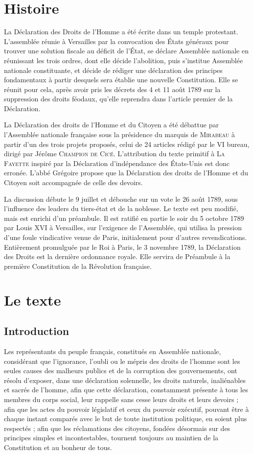\documentclass{book}
\begin{document}
\chapter{Histoire}
La Déclaration des Droits de l'Homme a été écrite dans un temple protestant. L’assemblée réunie à Versailles par la convocation des États généraux pour trouver une solution fiscale au déficit de l’État, se déclare Assemblée nationale en réunissant les trois ordres, dont elle décide l’abolition, puis s’institue Assemblée nationale constituante, et décide de rédiger une déclaration des principes fondamentaux à partir desquels sera établie une nouvelle Constitution. Elle se réunit pour cela, après avoir pris les décrets des 4 et 11 août 1789 sur la suppression des droits féodaux, qu’elle reprendra dans l’article premier de la Déclaration.

La Déclaration des droits de l’Homme et du Citoyen a été débattue par l’Assemblée nationale française sous la présidence du marquis de \textsc{Mirabeau} à partir d’un des trois projets proposés, celui de 24 articles rédigé par le VI bureau, dirigé par Jérôme \textsc{Champion de Cicé}. L’attribution du texte primitif à \textsc{La Fayette} inspiré par la Déclaration d'indépendance des États-Unis est donc erronée. L’abbé Grégoire propose que la Déclaration des droits de l’Homme et du Citoyen soit accompagnée de celle des devoirs.

La discussion débute le 9 juillet et débouche sur un vote le 26 août 1789, sous l’influence des leaders du tiers-état et de la noblesse. Le texte est peu modifié, mais est enrichi d’un préambule. Il est ratifié en partie le soir du 5 octobre 1789 par Louis XVI à Versailles, sur l’exigence de l’Assemblée, qui utilisa la pression d’une foule vindicative venue de Paris, initialement pour d’autres revendications.
Entièrement promulguée par le Roi à Paris, le 3 novembre 1789, la Déclaration des Droits est la dernière ordonnance royale. Elle servira de Préambule à la première Constitution de la Révolution française.

\chapter{Le texte}
\section{Introduction}

Les représentants du peuple français, constitués en Assemblée nationale, considérant que l’ignorance, l’oubli ou le mépris des droits de l’homme sont les seules causes des malheurs publics et de la corruption des gouvernements, ont résolu d’exposer, dans une déclaration solennelle, les droits naturels, inaliénables et sacrés de l’homme, afin que cette déclaration, constamment présente à tous les membres du corps social, leur rappelle sans cesse leurs droits et leurs devoirs ; afin que les actes du pouvoir législatif et ceux du pouvoir exécutif, pouvant être à chaque instant comparés avec le but de toute institution politique, en soient plus respectés ; afin que les réclamations des citoyens, fondées désormais sur des principes simples et incontestables, tournent toujours au maintien de la Constitution et au bonheur de tous.
\end{document}
